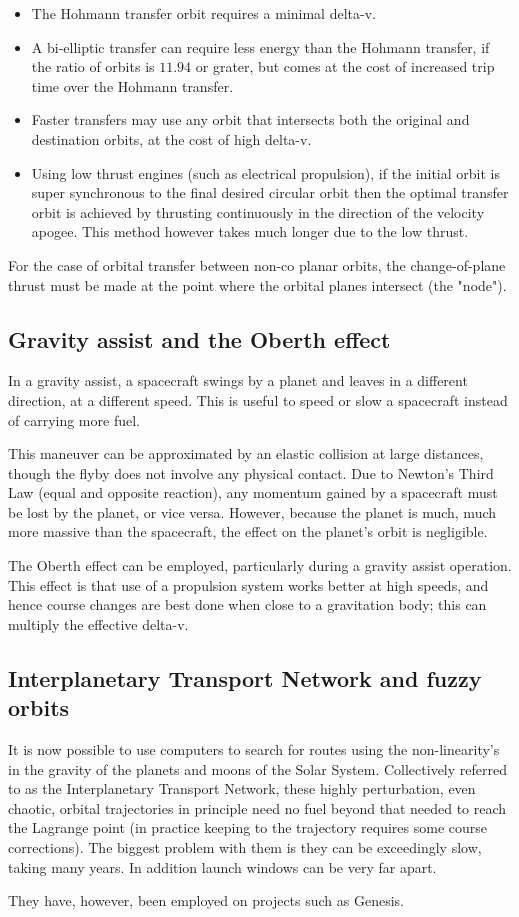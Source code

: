 \documentclass[12pt]{article}
\begin{document}
\begin{itemize}
  \item The Hohmann transfer orbit requires a minimal delta-v.
  \item A bi-elliptic transfer can require less energy than the Hohmann transfer, if the ratio of orbits is \(11.94\) or grater, but comes at the cost of increased trip time over the Hohmann transfer.
  \item Faster transfers may use any orbit that intersects both the original and destination orbits, at the cost of high delta-v.
  \item Using low thrust engines (such as electrical propulsion), if the initial orbit is super synchronous to the final desired circular orbit then the optimal transfer orbit is achieved by thrusting continuously in the direction of the velocity apogee. This method however takes much longer due to the low thrust.
\end{itemize}

For the case of orbital transfer between non-co planar orbits, the change-of-plane thrust must be made at the point where the orbital planes intersect (the "node").

\subsection{Gravity assist and the Oberth effect}

In a gravity assist, a spacecraft swings by a planet and leaves in a different direction, at a different speed. This is useful to speed or slow a spacecraft instead of carrying more fuel.

This maneuver can be approximated by an elastic collision at large distances, though the flyby does not involve any physical contact. Due to Newton's Third Law (equal and opposite reaction), any momentum gained by a spacecraft must be lost by the planet, or vice versa. However, because the planet is much, much more massive than the spacecraft, the effect on the planet's orbit is negligible.

The Oberth effect can be employed, particularly during a gravity assist operation. This effect is that use of a propulsion system works better at high speeds, and hence course changes are best done when close to a gravitation body; this can multiply the effective delta-v.

\subsection{Interplanetary Transport Network and fuzzy orbits}

It is now possible to use computers to search for routes using the non-linearity's in the gravity of the planets and moons of the Solar System. Collectively referred to as the Interplanetary Transport Network, these highly perturbation, even chaotic, orbital trajectories in principle need no fuel beyond that needed to reach the Lagrange point (in practice keeping to the trajectory requires some course corrections). The biggest problem with them is they can be exceedingly slow, taking many years. In addition launch windows can be very far apart.

They have, however, been employed on projects such as Genesis.
\end{document}
